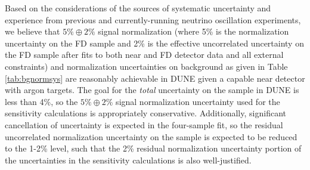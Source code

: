 Based on the considerations of the sources of systematic uncertainty 
and experience from previous and currently-running neutrino oscillation
experiments, we believe that $5\% \oplus 2\%$ signal normalization (where 5\% is the normalization uncertainty on the
FD \numu sample and 2\% is the effective uncorrelated uncertainty on the FD \nue sample after fits to both near
and FD detector data and all external constraints) and normalization uncertainties on background as given
in Table \ref{tab:bgnormsys} are reasonably achievable in DUNE given a capable near detector with argon targets.
The goal for the \emph{total} uncertainty on the \nue sample in
DUNE is less than 4\%, so the $5\% \oplus 2\%$ \nue signal normalization uncertainty
used for the sensitivity calculations is appropriately conservative.
Additionally, significant cancellation of uncertainty is expected in the four-sample fit, so the
residual uncorrelated normalization uncertainty on the \nue sample is expected to be reduced to the 1-2\% level,
such that the 2\% residual normalization uncertainty portion of the uncertainties in the sensitivity calculations
is also well-justified.
%
